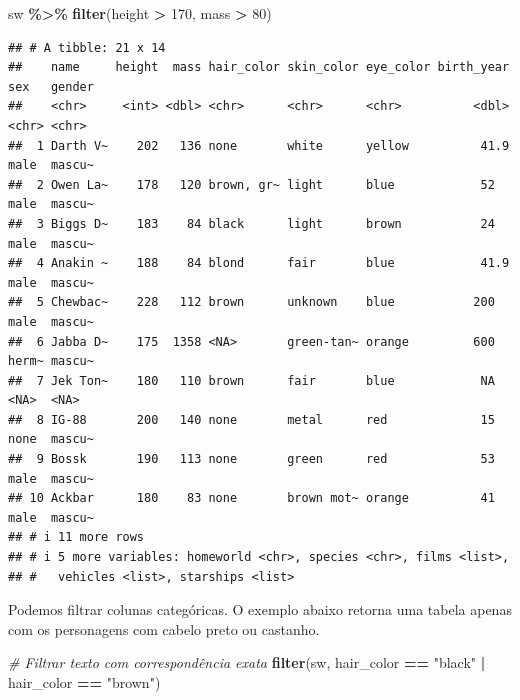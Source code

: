 \documentclass[
]{book}
\newenvironment{Shaded}{\begin{snugshade}}{\end{snugshade}}
\newcommand{\CommentTok}[1]{\textcolor[rgb]{0.56,0.35,0.01}{\textit{#1}}}
\newcommand{\DecValTok}[1]{\textcolor[rgb]{0.00,0.00,0.81}{#1}}
\newcommand{\FunctionTok}[1]{\textcolor[rgb]{0.13,0.29,0.53}{\textbf{#1}}}
\newcommand{\NormalTok}[1]{#1}
\newcommand{\SpecialCharTok}[1]{\textcolor[rgb]{0.81,0.36,0.00}{\textbf{#1}}}
\newcommand{\StringTok}[1]{\textcolor[rgb]{0.31,0.60,0.02}{#1}}
\begin{document}
\begin{Shaded}
\begin{Highlighting}[]
\NormalTok{sw }\SpecialCharTok{\%\textgreater{}\%} \FunctionTok{filter}\NormalTok{(height }\SpecialCharTok{\textgreater{}} \DecValTok{170}\NormalTok{, mass }\SpecialCharTok{\textgreater{}} \DecValTok{80}\NormalTok{)}
\end{Highlighting}
\end{Shaded}

\begin{verbatim}
## # A tibble: 21 x 14
##    name     height  mass hair_color skin_color eye_color birth_year sex   gender
##    <chr>     <int> <dbl> <chr>      <chr>      <chr>          <dbl> <chr> <chr> 
##  1 Darth V~    202   136 none       white      yellow          41.9 male  mascu~
##  2 Owen La~    178   120 brown, gr~ light      blue            52   male  mascu~
##  3 Biggs D~    183    84 black      light      brown           24   male  mascu~
##  4 Anakin ~    188    84 blond      fair       blue            41.9 male  mascu~
##  5 Chewbac~    228   112 brown      unknown    blue           200   male  mascu~
##  6 Jabba D~    175  1358 <NA>       green-tan~ orange         600   herm~ mascu~
##  7 Jek Ton~    180   110 brown      fair       blue            NA   <NA>  <NA>  
##  8 IG-88       200   140 none       metal      red             15   none  mascu~
##  9 Bossk       190   113 none       green      red             53   male  mascu~
## 10 Ackbar      180    83 none       brown mot~ orange          41   male  mascu~
## # i 11 more rows
## # i 5 more variables: homeworld <chr>, species <chr>, films <list>,
## #   vehicles <list>, starships <list>
\end{verbatim}

Podemos filtrar colunas categóricas. O exemplo abaixo retorna uma tabela
apenas com os personagens com cabelo preto ou castanho.

\begin{Shaded}
\begin{Highlighting}[]
\CommentTok{\# Filtrar texto com correspondência exata}
\FunctionTok{filter}\NormalTok{(sw, hair\_color }\SpecialCharTok{==} \StringTok{"black"} \SpecialCharTok{|}\NormalTok{ hair\_color }\SpecialCharTok{==} \StringTok{"brown"}\NormalTok{)}
\end{Highlighting}
\end{Shaded}
\end{document}
